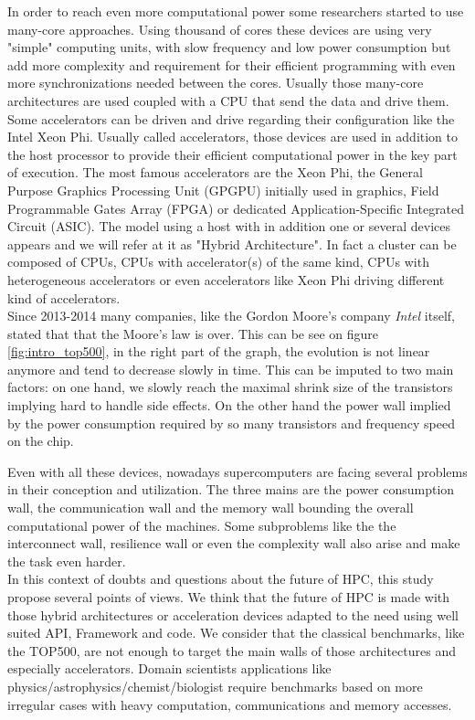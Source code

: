 In order to reach even more computational power some researchers started to use many-core approaches. 
Using thousand of cores these devices are using very "simple" computing units, with slow frequency and low power consumption but add more complexity and requirement for their efficient programming with even more synchronizations needed between the cores. 
Usually those many-core architectures are used coupled with a CPU that send the data and drive them.
Some accelerators can be driven and drive regarding their configuration like the Intel Xeon Phi. 
Usually called accelerators, those devices are used in addition to the host processor to provide their efficient computational power in the key part of execution. 
The most famous accelerators are the Xeon Phi, the General Purpose Graphics Processing Unit (GPGPU) initially used in graphics, Field Programmable Gates Array (FPGA) or dedicated Application-Specific Integrated Circuit (ASIC).
The model using a host with in addition one or several devices appears and we will refer at it as "Hybrid Architecture".
In fact a cluster can be composed of CPUs, CPUs with accelerator(s) of the same kind, CPUs with heterogeneous accelerators or even accelerators like Xeon Phi driving different kind of accelerators.\\

Since 2013-2014 many companies, like the Gordon Moore's company \textit{Intel} itself, stated that that the Moore's law is over. 
This can be see on figure \ref{fig:intro_top500}, in the right part of the graph, the evolution is not linear anymore and tend to decrease slowly in time. 
This can be imputed to two main factors: on one hand, we slowly reach the maximal shrink size of the transistors implying hard to handle side effects. 
On the other hand the power wall implied by the power consumption required by so many transistors and frequency speed on the chip.

Even with all these devices, nowadays supercomputers are facing several problems in their conception and utilization. 
The three mains are the power consumption wall, the communication wall and the memory wall bounding the overall computational power of the machines.  
Some subproblems like the the interconnect wall, resilience wall or even the complexity wall also arise and make the task even harder.\\

In this context of doubts and questions about the future of HPC, this study propose several points of views. 
We think that the future of HPC is made with those hybrid architectures or acceleration devices adapted to the need using well suited API, Framework and code.
We consider that the classical benchmarks, like the TOP500, are not enough to target the main walls of those architectures and especially accelerators. 
Domain scientists applications like physics/astrophysics/chemist/biologist require benchmarks based on more irregular cases with heavy computation, communications and memory accesses. 

